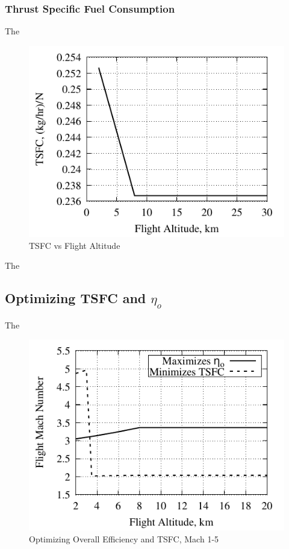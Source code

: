 \documentclass[conf]{new-aiaa} %
\begin{document}
\subsubsection{Thrust Specific Fuel Consumption}
The

\begin{figure}[H] %
    \centering
    \includegraphics[]{media/performance_parameter_files/part_d_TSFC.pdf}
    \caption{\label{fig:partdtsfc}TSFC vs Flight Altitude}
\end{figure}
The

\subsection{Optimizing TSFC and \texorpdfstring{$\eta_o$}{eta\_o}} %
The

\begin{figure}[H] %
    \centering
    \includegraphics[]{media/performance_parameter_files/part_e_range_1_5.pdf}
    \caption{\label{fig:parte1-5}Optimizing Overall Efficiency and TSFC, Mach 1-5}
\end{figure}
\end{document}
